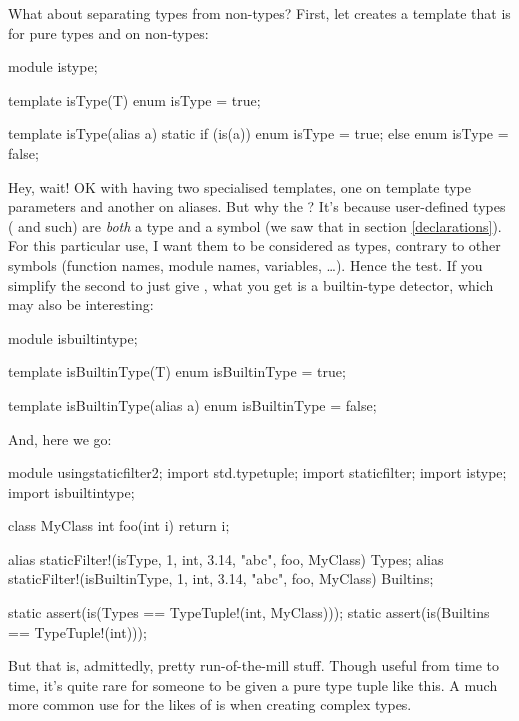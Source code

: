 What about separating types from non-types? First, let creates a template that is  for pure types and  on non-types:

\begin{dcode}
module istype;

template isType(T)
{
    enum isType = true;
}

template isType(alias a)
{
    static if (is(a))
        enum isType = true;
    else
        enum isType = false;
}
\end{dcode}

Hey, wait! OK with having two specialised templates, one on template type parameters and another on aliases. But why the ? It's because user-defined types ( and such) are \emph{both} a type and a symbol (we saw that in section \ref{declarations}). For this particular use, I want them to be considered as types, contrary to other symbols (function names, module names, variables, \ldots). Hence the \DD{()} test. If you simplify the second  to just give , what you get is a builtin-type detector, which may also be interesting:

\begin{dcode}
module isbuiltintype;

template isBuiltinType(T)
{
    enum isBuiltinType = true;
}

template isBuiltinType(alias a)
{
    enum isBuiltinType = false;
}
\end{dcode}

And, here we go:

\begin{dcode}
module usingstaticfilter2;
import std.typetuple;
import staticfilter;
import istype;
import isbuiltintype;

class MyClass {}
int foo(int i) { return i;}

alias staticFilter!(isType, 1, int, 3.14, "abc", foo, MyClass) Types;
alias staticFilter!(isBuiltinType, 1, int, 3.14, "abc", foo, MyClass) Builtins;

static assert(is(Types == TypeTuple!(int, MyClass)));
static assert(is(Builtins == TypeTuple!(int)));
\end{dcode}

But that is, admittedly, pretty run-of-the-mill stuff. Though useful from time to time, it's quite rare for someone to be given a pure type tuple like this. A much more common use for the likes of  is when creating complex types.

